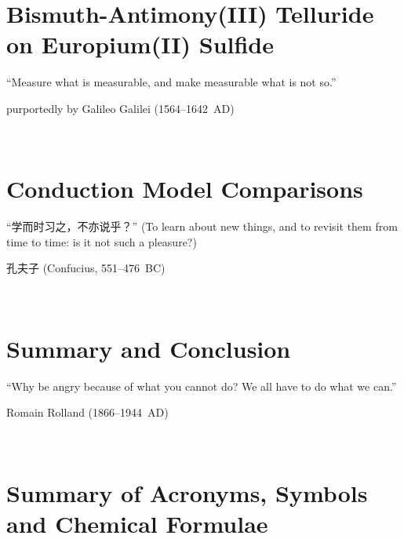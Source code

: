 ﻿\documentclass{report}
\begin{document}
\chapter{Bismuth-Antimony(III) Telluride on Europium(II) Sulfide}\label{ch:bilayer2018}
\begin{refsection}
\epigraph{``Measure what is measurable, and make measurable what is not so.''}{purportedly by Galileo Galilei (1564--1642~AD)}~\\
    
    \printbibliography[heading=subbibintoc, title=References for Chapter~\thechapter]
\end{refsection}

\chapter{Conduction Model Comparisons}\label{ch:models}
\begin{refsection}
    \begin{CJK*}{UTF8}{gkai}
    \epigraph{``学而时习之，不亦说乎？'' (To learn about new things, and to revisit them from time to time: is it not such a pleasure?)}{孔夫子 (Confucius, 551--476~BC)}~\\
    \end{CJK*}
    
    \printbibliography[heading=subbibintoc, title=References for Chapter~\thechapter]
\end{refsection}

\chapter{Summary and Conclusion}\label{ch:conclusion}
\epigraph{``Why be angry because of what you cannot do? We all have to do what we can.''}{Romain Rolland (1866--1944~AD)}~\\
    
\appendix
%
%
\chapter{Summary of Acronyms, Symbols and Chemical Formulae}
    
\end{document}
